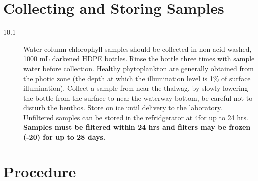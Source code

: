 \documentclass[12pt]{../SOP2}
\begin{document}
\section{Collecting and Storing Samples}
\begin{description}
\item[10.1] Water column chlorophyll samples should be collected in non-acid washed, 1000 mL darkened HDPE bottles. Rinse the bottle three times with sample water before collection. Healthy phytoplankton are generally obtained from the photic zone (the depth at which the illumination level is 1\% of surface illumination). Collect a sample from near the thalwag, by slowly lowering the bottle from the surface to near the waterway bottom, be careful not to disturb the benthos. Store on ice until delivery to the laboratory. Unfiltered samples can be stored in the refridgerator at 4\celsius for up to 24 hrs. \textbf{Samples must be filtered within 24 hrs and filters may be frozen (-20\celsius) for up to 28 days.}
\end{description}
\section{Procedure}
\end{document}

